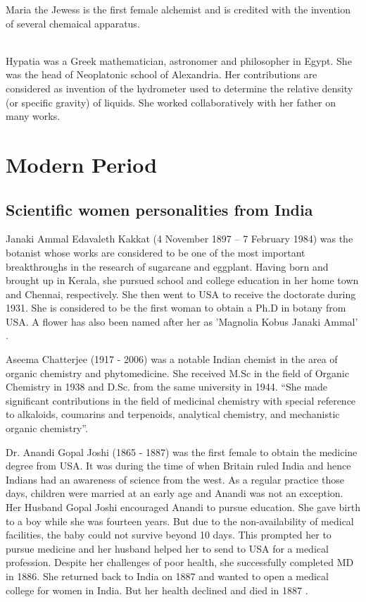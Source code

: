 \documentclass[a4paper,10pt]{article}
\begin{document}
\newblock
Maria the Jewess is the first female alchemist and is credited with the invention of several chemaical apparatus.

\newblock
\\Hypatia was a Greek mathematician, astronomer and philosopher in Egypt. She was the head of Neoplatonic school of Alexandria. Her contributions are considered as invention of the hydrometer used to determine the relative density (or specific gravity) of liquids. She worked collaboratively with her father on many works.\\

\section{Modern Period}
\subsection{Scientific women personalities from India}

\newblock
Janaki Ammal Edavaleth Kakkat (4 November 1897 – 7 February 1984) was the botanist whose works are considered to be one of the most important breakthroughs in the research of sugarcane and eggplant. Having born and brought up in Kerala, she pursued school and college education in her home town and Chennai, respectively. She then went to USA to receive the doctorate during 1931. She is considered to be the first woman to obtain a Ph.D in botany from USA. A flower has also been named after her as 'Magnolia Kobus Janaki Ammal' \cite{janaki}.

\newblock
Aseema Chatterjee (1917 - 2006) was a notable Indian chemist in the area of organic chemistry and phytomedicine. She received M.Sc in the field of Organic Chemistry in 1938 and D.Sc. from the same university in 1944. ``She made significant contributions in the field of medicinal chemistry with special reference to alkaloids, coumarins and terpenoids, analytical chemistry, and mechanistic organic chemistry''.  \cite{chaterjee}


\newblock
Dr. Anandi Gopal Joshi (1865 - 1887) was the first female to obtain the medicine degree from USA. It was during the time of when Britain ruled India and hence Indians had an awareness of science from the west. As a regular practice those days, children were married at an early age and Anandi was not an exception. Her Husband Gopal Joshi encouraged Anandi to pursue education. She gave birth to a boy while she was fourteen years. But due to the non-availability of medical facilities, the baby could not survive beyond 10 days. This prompted her to pursue medicine and her husband helped her to send to USA for a medical profession. Despite her challenges of poor health, she successfully completed MD in 1886. She returned back to India on 1887 and wanted to open a medical college for women in India. But her health declined and died in 1887  \cite{joshi}.
\end{document}
